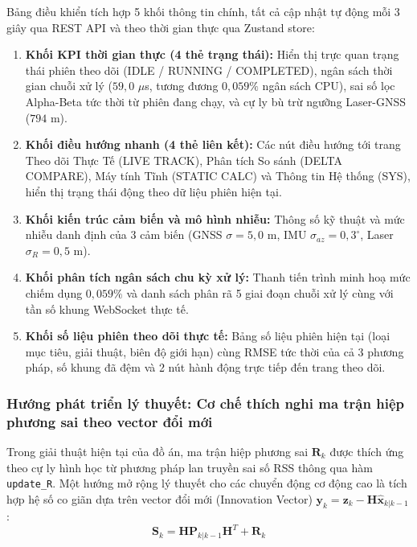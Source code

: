 Bảng điều khiển tích hợp 5 khối thông tin chính, tất cả cập nhật tự động mỗi 3 giây qua REST API và theo thời gian thực qua Zustand store:
\begin{enumerate}
    \item \textbf{Khối KPI thời gian thực (4 thẻ trạng thái):} Hiển thị trực quan trạng thái phiên theo dõi (IDLE / RUNNING / COMPLETED), ngân sách thời gian chuỗi xử lý ($59{,}0$ $\mu$s, tương đương $0{,}059\%$ ngân sách CPU), sai số lọc Alpha-Beta tức thời từ phiên đang chạy, và cự ly bù trừ ngưỡng Laser-GNSS ($794$ m).
    \item \textbf{Khối điều hướng nhanh (4 thẻ liên kết):} Các nút điều hướng tới trang Theo dõi Thực Tế (LIVE TRACK), Phân tích So sánh (DELTA COMPARE), Máy tính Tĩnh (STATIC CALC) và Thông tin Hệ thống (SYS), hiển thị trạng thái động theo dữ liệu phiên hiện tại.
    \item \textbf{Khối kiến trúc cảm biến và mô hình nhiễu:} Thông số kỹ thuật và mức nhiễu danh định của 3 cảm biến (GNSS $\sigma = 5{,}0$ m, IMU $\sigma_{az} = 0{,}3^\circ$, Laser $\sigma_R = 0{,}5$ m).
    \item \textbf{Khối phân tích ngân sách chu kỳ xử lý:} Thanh tiến trình minh hoạ mức chiếm dụng $0{,}059\%$ và danh sách phân rã 5 giai đoạn chuỗi xử lý cùng với tần số khung WebSocket thực tế.
    \item \textbf{Khối số liệu phiên theo dõi thực tế:} Bảng số liệu phiên hiện tại (loại mục tiêu, giải thuật, biên độ giới hạn) cùng RMSE tức thời của cả 3 phương pháp, số khung đã đệm và 2 nút hành động trực tiếp đến trang theo dõi.
\end{enumerate}

\subsubsection{Hướng phát triển lý thuyết: Cơ chế thích nghi ma trận hiệp phương sai theo vector đổi mới}

\hspace{0.5cm} Trong giải thuật hiện tại của đồ án, ma trận hiệp phương sai $\mathbf{R}_k$ được thích ứng theo cự ly hình học từ phương pháp lan truyền sai số RSS thông qua hàm \texttt{update\_R}. Một hướng mở rộng lý thuyết cho các chuyển động cơ động cao là tích hợp hệ số co giãn dựa trên vector đổi mới (Innovation Vector) $\mathbf{y}_k = \mathbf{z}_k - \mathbf{H} \hat{\mathbf{x}}_{k|k-1}$:
\begin{equation}
\mathbf{S}_k = \mathbf{H} \mathbf{P}_{k|k-1} \mathbf{H}^T + \mathbf{R}_k
\label{eq:innovation-covariance-formula}
\end{equation}

